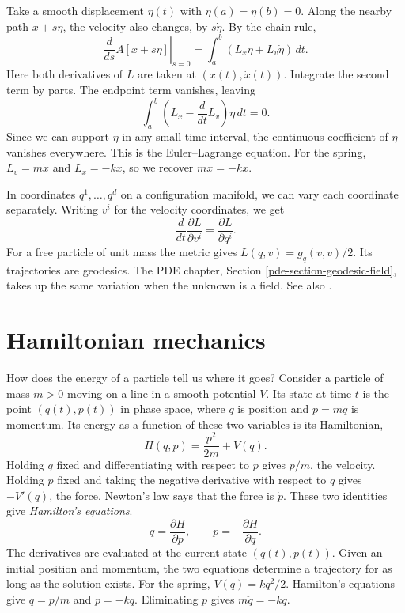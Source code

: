 Take a smooth displacement $\eta(t)$ with
$\eta(a)=\eta(b)=0$. Along the nearby
path $x+s\eta$, the velocity also changes,
by $s\dot\eta$. By the chain rule,
$$
\left.\frac{d}{ds}A[x+s\eta]\right|_{s=0}
=\int_a^b(L_x\eta+L_v\dot\eta)\,dt.
$$
Here both derivatives of $L$ are taken at
$(x(t),\dot x(t))$. Integrate the second
term by parts. The endpoint term vanishes,
leaving
$$
\int_a^b
\left(L_x-\frac{d}{dt}L_v\right)\eta\,dt=0.
$$
Since we can support $\eta$ in any small
time interval, the continuous coefficient
of $\eta$ vanishes everywhere. This is the
Euler--Lagrange equation. For the spring,
$L_v=m\dot x$ and $L_x=-kx$, so we recover
$m\ddot x=-kx$.

In coordinates $q^1,\ldots,q^d$ on a
configuration manifold, we can vary each
coordinate separately. Writing $v^i$ for
the velocity coordinates, we get
$$
\frac{d}{dt}
\frac{\partial L}{\partial v^i}
=\frac{\partial L}{\partial q^i}.
$$
For a free particle of unit mass the
metric gives $L(q,v)=g_q(v,v)/2$.
Its trajectories are geodesics. The PDE
chapter, Section
\ref{pde-section-geodesic-field}, takes up
the same variation when the unknown is a
field. See also
\cite[Sections 12, 13 and 19]{arn}.

\section{Hamiltonian mechanics}
\label{section-hamiltonian-mechanics}

How does the energy of a particle tell us
where it goes? Consider a particle of mass
$m>0$ moving on a line in a smooth
potential $V$. Its state at time $t$ is
the point $(q(t),p(t))$ in phase space,
where $q$ is position and $p=m\dot q$ is
momentum. Its energy as a function of
these two variables is its Hamiltonian,
$$
H(q,p)=\frac{p^2}{2m}+V(q).
$$
Holding $q$ fixed and differentiating
with respect to $p$ gives $p/m$, the
velocity. Holding $p$ fixed and taking
the negative derivative with respect to
$q$ gives $-V'(q)$, the force. Newton's
law says that the force is $\dot p$.
These two identities give
\emph{Hamilton's equations}.
$$
\dot q=\frac{\partial H}{\partial p},
\qquad
\dot p=-\frac{\partial H}{\partial q}.
$$
The derivatives are evaluated at the
current state $(q(t),p(t))$. Given an
initial position and momentum, the two
equations determine a trajectory for as
long as the solution exists. For the
spring, $V(q)=kq^2/2$. Hamilton's equations
give $\dot q=p/m$ and $\dot p=-kq$.
Eliminating $p$ gives $m\ddot q=-kq$.


